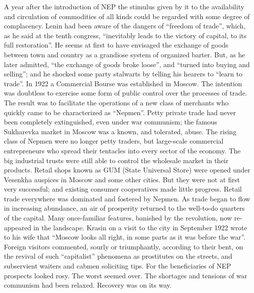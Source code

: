 A year after the introduction of NEP the stimulus given by it to the availability and circulation of commodities of all kinds could be regarded with some degree of complacency. Lenin had been aware of the dangers of ``freedom of trade'', which, as he said at the tenth congress, ``inevitably leads to the victory of capital, to its full restoration''. He seems at first to have envisaged the exchange of goods between town and country as a grandiose system of organized barter. But, as he later admitted, ``the exchange of goods broke loose'', and ``turned into buying and selling''; and he shocked some party stalwarts by telling his hearers to ``learn to trade''. In 1922 a Commercial Bourse was established in Moscow. The intention was doubtless to exercise some form of public control over the processes of trade. The result was to facilitate the operations of a new class of merchants who quickly came to be characterized as ``Nepmen''. Petty private trade had never been completely extinguished, even under war communism; the famous Sukharevka market in Moscow was a known, and tolerated, abuse. The rising class of Nepmen were no longer petty traders, but large-scale commercial entrepreneurs who spread their tentacles into every sector of the economy. The big industrial trusts were still able to control the wholesale market in their products. Retail shops known as GUM (State Universal Store) were opened under Vesenkha auspices in Moscow and some other cities. But they were not at first very successful; and existing consumer cooperatives made little progress. Retail trade everywhere was dominated and fostered by Nepmen. As trade began to flow in increasing abundance, an air of prosperity returned to the well-to-do quarters of the capital. Many once-familiar features, banished by the revolution, now re-appeared in the landscape. Krasin on a visit to the city in September 1922 wrote to his wife that ``Moscow looks all right, in some parts as it was before the war''. Foreign visitors commented, sourly or triumphantly, according to their bent, on the revival of such ``capitalist'' phenomena as prostitutes on the streets, and subservient waiters and cabmen soliciting tips. For the beneficiaries of NEP prospects looked rosy. The worst seemed over. The shortages and tensions of war communism had been relaxed. Recovery was on its way. 

